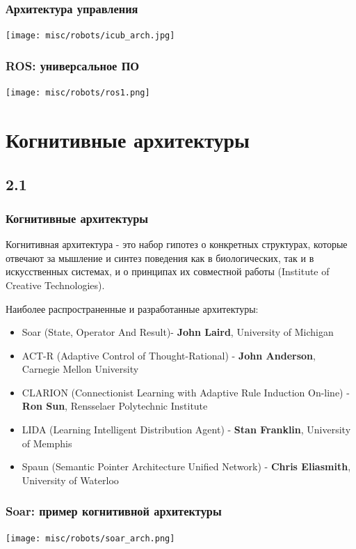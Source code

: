 \documentclass[default]{beamer}
\begin{document}
	\begin{frame}
		\frametitle{Архитектура управления}
		
		\centering
		\texttt{[image: misc/robots/icub\_arch.jpg]}
		
	\end{frame}
		
	\begin{frame}
		\frametitle{ROS: универсальное ПО}
		
		\centering
		\texttt{[image: misc/robots/ros1.png]}
		
	\end{frame}


	\section{Когнитивные архитектуры}
	\subsection{2.1}
	\begin{frame}	
		\frametitle{Когнитивные архитектуры}


	Когнитивная архитектура - это набор гипотез о конкретных структурах, которые отвечают за мышление и синтез поведения как в биологических, так и в искусственных системах, и о принципах их совместной работы (Institute of Creative Technologies).
	\par\bigskip
	Наиболее распространенные и разработанные архитектуры:
	\begin{itemize}
		\item Soar (State, Operator And Result)-  \textbf{John Laird}, University of Michigan
		\item ACT-R (Adaptive Control of Thought-Rational) - \textbf{John Anderson}, Carnegie Mellon University
		\item CLARION (Connectionist Learning with Adaptive Rule Induction On-line) - \textbf{Ron Sun}, Rensselaer Polytechnic Institute
		\item LIDA (Learning Intelligent Distribution Agent)  -  \textbf{Stan Franklin}, University of Memphis
		\item Spaun (Semantic Pointer Architecture Unified Network) - \textbf{Chris Eliasmith}, University of Waterloo
	\end{itemize}
	\end{frame}

	\begin{frame}
		\frametitle{Soar: пример когнитивной архитектуры}
		
		\centering
		\texttt{[image: misc/robots/soar\_arch.png]}
		
	\end{frame}
\end{document}
